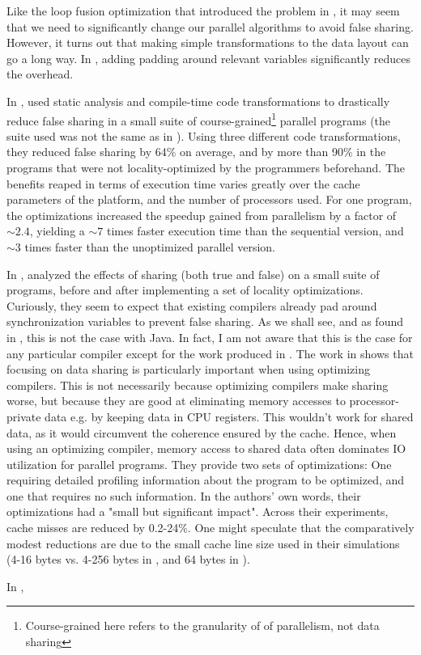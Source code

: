 Like the loop fusion optimization that introduced the problem in \cite{mystery},
it may seem that we need to significantly change our parallel algorithms to
avoid false sharing. However, it turns out that making simple transformations to
the data layout can go a long way. In \cite{mystery}, adding padding around
relevant variables significantly reduces the overhead.

In \citeyear{EggersReducing}, \citeauthor{EggersReducing} used static analysis
and compile-time code transformations to drastically reduce false sharing in a
small suite of course-grained\footnote{Course-grained here refers to the
granularity of of parallelism, not data sharing} parallel programs
\cite{EggersReducing} (the suite used was not the same as in \cite{Eggersbus}).
Using three different code transformations, they reduced false sharing by 64\%
on average, and by more than 90\% in the programs that were not
locality-optimized by the programmers beforehand. The benefits reaped in terms
of execution time varies greatly over the cache parameters of the platform, and
the number of processors used. For one program, the optimizations increased the
speedup gained from parallelism by a factor of $\sim 2.4$, yielding a $\sim 7$
times faster execution time than the sequential version, and $\sim 3$ times
faster than the unoptimized parallel version.

In \citeyear{TorrellasShared}, \citeauthor{TorrellasShared}
\cite{TorrellasShared} analyzed the effects of sharing (both true and false)
on a small suite of programs, before and after implementing a set of locality
optimizations. Curiously, they seem to expect that existing compilers already
pad around synchronization variables to prevent false sharing. As we shall see,
and as found in \cite{mystery}, this is not the case with Java. In fact, I am
not aware that this is the case for any particular compiler except for the work
produced in \cite{EggersReducing} .
The work in \cite{TorrellasShared} shows that focusing on data sharing is particularly important when
using optimizing compilers. This is not necessarily because optimizing compilers
make sharing worse, but because they are good at eliminating memory accesses to
processor-private data e.g. by keeping data in CPU registers. This wouldn't work
for shared data, as it would circumvent the coherence ensured by the cache.
Hence, when using an optimizing compiler, memory access to shared data often
dominates IO utilization for parallel programs. They provide two sets of
optimizations: One requiring detailed profiling information about the program to
be optimized, and one that requires no such information. In the authors' own
words, their optimizations had a "small but significant impact". Across their
experiments, cache misses are reduced by 0.2-24\%. One might speculate that the
comparatively modest reductions are due to the small cache line size used in
their simulations (4-16 bytes vs. 4-256 bytes in \cite{EggersReducing}, and 64
bytes in \cite{mystery}).

In \citeyear{falsedef},
\citeauthor{falsedef} \cite{falsedef}



